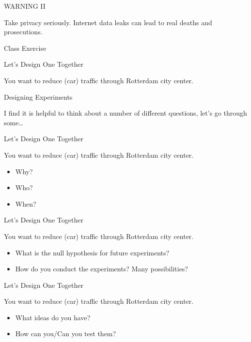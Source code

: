 \documentclass{beamer}
\begin{document}
\begin{frame}{WARNING II}

Take privacy seriously.  Internet data leaks can lead to real deaths and prosecutions.

\end{frame}


\begin{frame}{Class Exercise}

\end{frame}


\begin{frame}{Let's Design One Together}

You want to reduce (car) traffic through Rotterdam city center.

\end{frame}


\begin{frame}{Designing Experiments}

I find it is helpful to think about a number of different questions, let's go through some\ldots

\end{frame}


\begin{frame}{Let's Design One Together}

You want to reduce (car) traffic through Rotterdam city center.
\begin{itemize}
\item Why?  
\item Who?
\item When?
\end{itemize}


\end{frame}



\begin{frame}{Let's Design One Together}

You want to reduce (car) traffic through Rotterdam city center.
\begin{itemize}
\item What is the null hypothesis for future experiments?
\item How do you conduct the experiments?  Many possibilities?
\end{itemize}


\end{frame}


\begin{frame}{Let's Design One Together}

You want to reduce (car) traffic through Rotterdam city center.
\begin{itemize}
\item What ideas do you have?
\item How can you/Can you test them?
\end{itemize}


\end{frame}
\end{document}

